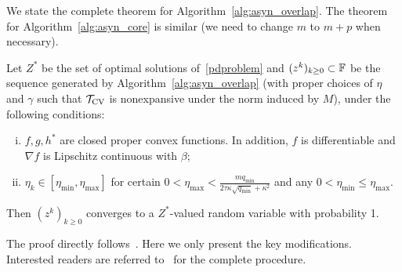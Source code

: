 {We state the complete theorem for Algorithm~\ref{alg:asyn_overlap}. The theorem for Algorithm~\ref{alg:asyn_core} is similar (we need to change $m$ to $m+p$ when necessary).
\begin{thm}\label{thm:async-convergence2}
Let $Z^*$ be the set of optimal solutions of~\eqref{pdproblem} and $(z^k)_{k\geq0}\subset \mathbb{F}$ be the sequence generated by Algorithm~\ref{alg:asyn_overlap} (with proper choices of $\eta$ and $\gamma$ such that ${{\mathcal{T}}_{\textnormal{CV}}}$ is nonexpansive under the norm induced by $M$), under the following conditions:
\begin{enumerate}[(i)]
\item $f,g,h^*$ are closed proper convex functions. In addition, $f$ is differentiable and $\nabla f$ is Lipschitz continuous with $\beta$;
\item $\eta_k
\in [\eta_{\min}, \eta_{\max}]$ for certain $0<\eta_{\max}<\frac{mq_{\min}}{2\tau\kappa
\sqrt{q_{\min}}+\kappa^2}$ and any $0<\eta_{\min}\leq\eta_{\max}$.
\end{enumerate}
Then $(z^k)_{k\geq 0}$ converges to a $Z^*$-valued random variable with probability 1.
\end{thm}
The proof directly follows~\cite[Section 3]{Peng_2015_AROCK}. Here we only present the key modifications. Interested readers are referred to~\cite{Peng_2015_AROCK} for the complete procedure.
 
}
